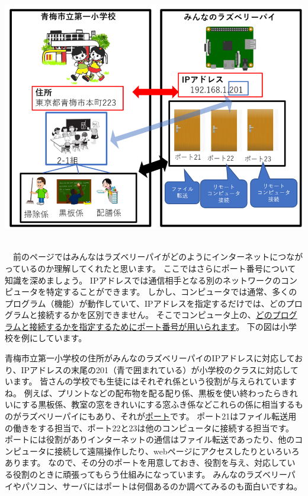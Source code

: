 \documentclass[a4paper,12pt,dvipdfmx]{jarticle}
\begin{document}
\centering
\includegraphics[width=15.004cm,height=11.0cm]{ome7-img020.png}
\flushleft

　前のページではみんなはラズベリーパイがどのようにインターネットにつながっているのか理解してくれたと思います。
ここではさらにポート番号について知識を深めましょう。
IPアドレスでは通信相手となる別のネットワークのコンピュータを特定することができます。
しかし、コンピュータでは通常、多くのプログラム（機能）が動作していて、IPアドレスを指定するだけでは、どのプログラムと接続するかを区別できません。
そこでコンピュータ上の、\underline{どのプログラムと接続するかを指定するためにポート番号が用いられます}。
下の図は小学校を例にしています。

青梅市立第一小学校の住所がみんなのラズベリーパイのIPアドレスに対応しており、IPアドレスの末尾の201（青で囲まれている）が小学校のクラスに対応しています。
皆さんの学校でも生徒にはそれぞれ係という役割が与えられていますね。
例えば、プリントなどの配布物を配る配り係、黒板を使い終わったらきれいにする黒板係、教室の窓をきれいにする窓ふき係などこれらの係に相当するものがラズベリーパイにもあり、それが\underline{ポート}です。
ポート21はファイル転送用の働きをする担当で、ポート22と23は他のコンピュータに接続する担当です。
ポートには役割がありインターネットの通信はファイル転送であったり、他のコンピュータに接続して遠隔操作したり、webページにアクセスしたりといろいろあります。
なので、その分のポートを用意しておき、役割を与え、対応している役割のときに頑張ってもらう仕組みになっています。
みんなのラズベリーパイやパソコン、サーバにはポートは何個あるのか調べてみるのも面白いですね。
\end{document}
